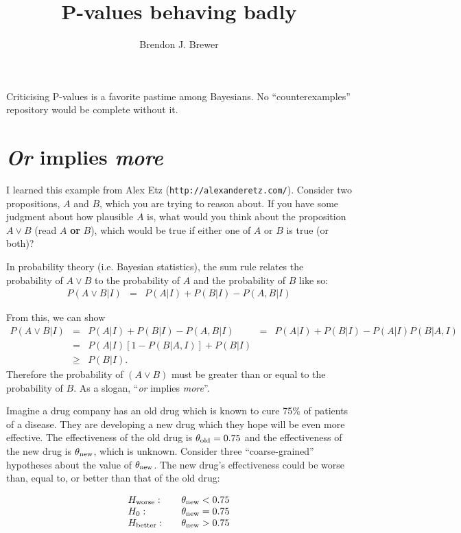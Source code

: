 \documentclass[a4paper, 12pt]{article}
\title{P-values behaving badly}
\author{Brendon J. Brewer}
\begin{document}
\maketitle

Criticising P-values is a favorite pastime among Bayesians. No
``counterexamples'' repository would be complete without it.

\section{{\em Or} implies {\em more}}
I learned this example from Alex Etz ({\tt http://alexanderetz.com/}).
Consider two propositions, $A$ and $B$, which you are trying to reason about.
If you have some judgment about how plausible $A$ is, what would you think
about the proposition $A \vee B$ (read $A$ {\bf or} $B$), which would be true
if either one of $A$ or $B$ is true (or both)? 

In probability theory (i.e. Bayesian statistics), the sum rule relates the
probability of $A \vee B$ to the probability of $A$ and the probability of
$B$ like so:
\begin{eqnarray}
P(A \vee B | I) &=& P(A | I) + P(B | I) - P(A, B | I)
\end{eqnarray}

From this, we can show
\begin{eqnarray}
P(A \vee B | I) &=& P(A | I) + P(B | I) - P(A, B | I)
                &=& P(A | I) + P(B | I) - P(A | I)P(B | A, I)\\
                &=& P(A | I)\left[1 - P(B | A,I)\right] + P(B | I)\\
                &\geq& P(B | I). 
\end{eqnarray}
Therefore the probability of $(A \vee B)$ must be greater than or equal to
the probability of $B$. As a slogan, ``{\em or} implies {\em more}''.


Imagine a drug company has an old drug which is known to cure
75\% of patients of a disease. They are developing a new drug
which they hope will be even more effective.
The effectiveness of the old drug is $\theta_{\rm old} = 0.75$ and the
effectiveness of the new drug is $\theta_{\rm new}$, which is unknown.
Consider three ``coarse-grained''
hypotheses about the value of $\theta_{\rm new}$. The new drug's
effectiveness could be worse than, equal to, or better than that of the old
drug:

\begin{equation}
\begin{array}{lcl}
H_{\rm worse}:  &  &\theta_{\rm new} < 0.75\\
H_0:            &  &\theta_{\rm new} = 0.75\\
H_{\rm better}: &  &\theta_{\rm new} > 0.75
\end{array}
\end{equation}
\end{document}
